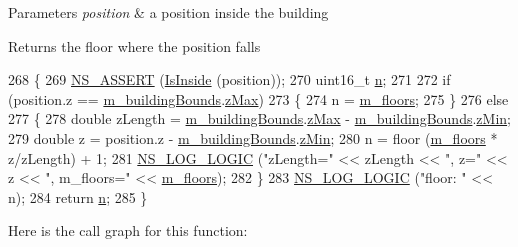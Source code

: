 \begin{DoxyParams}{Parameters}
{\em position} & a position inside the building\\
\hline
\end{DoxyParams}
\begin{DoxyReturn}{Returns}
the floor where the position falls 
\end{DoxyReturn}

\begin{DoxyCode}
268 \{
269   \hyperlink{assert_8h_a6dccdb0de9b252f60088ce281c49d052}{NS\_ASSERT} (\hyperlink{classns3_1_1Building_aa6fc519b99648c37c829fe52fa91eb8f}{IsInside} (position));
270   uint16\_t \hyperlink{namespacesample-rng-plot_aeb5ee5c431e338ef39b7ac5431242e1d}{n};
271 
272   \textcolor{keywordflow}{if} (position.z ==  \hyperlink{classns3_1_1Building_aec4c01efb67198b28de7a51b69a8d857}{m\_buildingBounds}.\hyperlink{classns3_1_1Box_ae4d135764bbc8421fe82ec91e4693b59}{zMax})
273     \{
274       n = \hyperlink{classns3_1_1Building_a82496b3cc437fd47bdec4d510fdba302}{m\_floors};
275     \}                                                                   
276   \textcolor{keywordflow}{else}
277     \{
278       \textcolor{keywordtype}{double} zLength = \hyperlink{classns3_1_1Building_aec4c01efb67198b28de7a51b69a8d857}{m\_buildingBounds}.\hyperlink{classns3_1_1Box_ae4d135764bbc8421fe82ec91e4693b59}{zMax} - 
      \hyperlink{classns3_1_1Building_aec4c01efb67198b28de7a51b69a8d857}{m\_buildingBounds}.\hyperlink{classns3_1_1Box_a9ab297b877a5c31dbfb344bd6f027e91}{zMin};
279       \textcolor{keywordtype}{double} z = position.z - \hyperlink{classns3_1_1Building_aec4c01efb67198b28de7a51b69a8d857}{m\_buildingBounds}.\hyperlink{classns3_1_1Box_a9ab297b877a5c31dbfb344bd6f027e91}{zMin};
280       n = floor (\hyperlink{classns3_1_1Building_a82496b3cc437fd47bdec4d510fdba302}{m\_floors} * z/zLength) + 1;
281       \hyperlink{group__logging_ga88acd260151caf2db9c0fc84997f45ce}{NS\_LOG\_LOGIC} (\textcolor{stringliteral}{"zLength="} << zLength << \textcolor{stringliteral}{", z="} << z << \textcolor{stringliteral}{", m\_floors="} << 
      \hyperlink{classns3_1_1Building_a82496b3cc437fd47bdec4d510fdba302}{m\_floors});
282     \}
283   \hyperlink{group__logging_ga88acd260151caf2db9c0fc84997f45ce}{NS\_LOG\_LOGIC} (\textcolor{stringliteral}{"floor: "} << n);
284   \textcolor{keywordflow}{return} \hyperlink{namespacesample-rng-plot_aeb5ee5c431e338ef39b7ac5431242e1d}{n};
285 \}
\end{DoxyCode}


Here is the call graph for this function\+:


